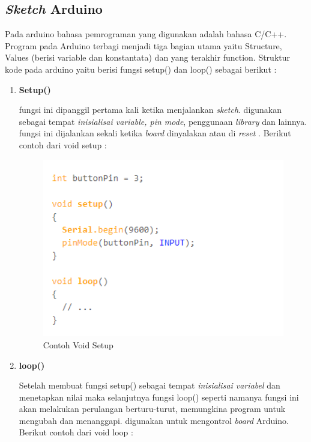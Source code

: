 \subsection{\textit{Sketch} Arduino}
\par Pada arduino bahasa pemrograman yang digunakan adalah bahasa C/C++. Program pada Arduino terbagi menjadi tiga bagian utama yaitu Structure, Values (berisi variable dan konstantata) dan yang terakhir function. Struktur kode pada arduino yaitu berisi fungsi  setup() dan loop() sebagai berikut :
\begin{enumerate}
 \item \textbf{Setup()}
   \par  fungsi ini dipanggil pertama kali ketika menjalankan \textit{sketch}. digunakan sebagai tempat \textit{inisialisai variable, pin mode}, penggunaan \textit{library} dan lainnya. fungsi ini dijalankan sekali ketika \textit{board} dinyalakan atau di \textit{reset} . Berikut contoh dari void setup :
    \begin{figure}
        \centering
        \includegraphics[width=1\textwidth]{figures/setup.png}
        \caption{Contoh Void Setup}
        \label{print}
    \end{figure}
    
    \item \textbf{loop()}
    \par Setelah membuat fungsi setup() sebagai tempat \textit{inisialisai variabel} dan menetapkan nilai maka selanjutnya fungsi loop() seperti namanya fungsi ini akan melakukan perulangan berturu-turut, memungkina program untuk mengubah dan menanggapi. digunakan untuk mengontrol \textit{board} Arduino. Berikut contoh dari void loop :
   


\end{enumerate}
